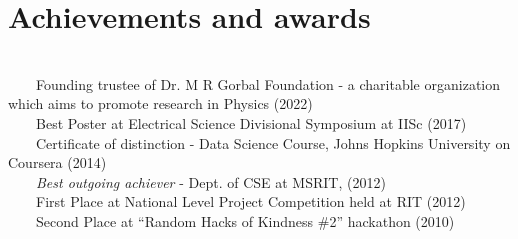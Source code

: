\documentclass[a4paper,10pt]{article} %
\newcommand{\tabitem}{~~\llap{\textbullet}~~}
\begin{document}
\section{Achievements and awards}
~\\
\tabitem Founding trustee of Dr. M R Gorbal Foundation - a charitable organization which aims to promote research in Physics (2022) \\
\tabitem Best Poster at Electrical Science Divisional Symposium at IISc (2017)\\
\tabitem Certificate of distinction - Data Science Course, Johns Hopkins University on Coursera (2014)\\
\tabitem \textit{Best outgoing achiever} - Dept. of CSE at MSRIT, (2012) \\
\tabitem First Place at National Level Project Competition held at RIT (2012)\\
\tabitem Second Place at “Random Hacks of Kindness \#2” hackathon (2010)\\


\iffalse
\end{document}

